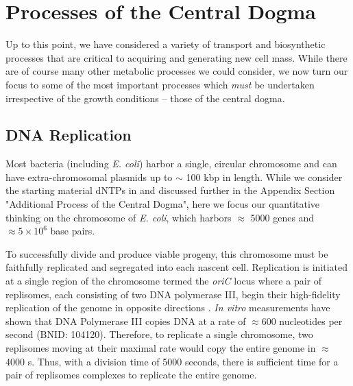 \section{Processes of the Central Dogma}
Up to this point, we have considered a variety of transport and biosynthetic
processes that are critical to acquiring and generating new cell mass. While
there are of course many other metabolic processes we could consider, we now
turn our focus to some of the most important processes which \textit{must} be
undertaken irrespective of the growth conditions -- those of the central
dogma.

\subsection{DNA Replication}
Most bacteria (including \textit{E. coli}) harbor a single, circular chromosome
and can have extra-chromosomal plasmids up to $\sim$ 100 kbp in length. While
we consider the starting material dNTPs in  and
discussed further in the Appendix Section "Additional Process of the Central Dogma", here we focus
our quantitative thinking on the chromosome of \textit{E. coli}, which
harbors $\approx$ 5000 genes and $\approx 5\times 10^6$ base pairs.

To successfully divide and produce viable progeny, this chromosome must be
faithfully replicated and segregated into each nascent cell. Replication is
initiated at a single region of the chromosome termed the \textit{oriC} locus
where a pair of replisomes, each consisting of two DNA polymerase III,
begin their high-fidelity replication of the genome in opposite directions
\citep{fijalkowska2012}. \textit{In vitro} measurements have shown that DNA
Polymerase III copies DNA at a rate of $\approx 600$ nucleotides per second
(BNID: 104120). Therefore, to replicate a single chromosome, two replisomes
moving at their maximal rate would copy the entire genome in $\approx$ 4000
s. Thus, with a division time of 5000 seconds, there is sufficient time for a pair
of replisomes complexes to replicate the entire genome.

